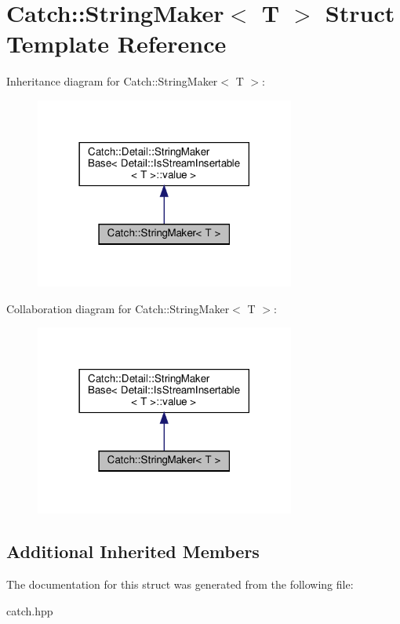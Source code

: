 \hypertarget{structCatch_1_1StringMaker}{}\section{Catch\+:\+:String\+Maker$<$ T $>$ Struct Template Reference}
\label{structCatch_1_1StringMaker}


Inheritance diagram for Catch\+:\+:String\+Maker$<$ T $>$\+:
\nopagebreak
\begin{figure}[H]
\begin{center}
\leavevmode
\includegraphics[width=242pt]{structCatch_1_1StringMaker__inherit__graph}
\end{center}
\end{figure}


Collaboration diagram for Catch\+:\+:String\+Maker$<$ T $>$\+:
\nopagebreak
\begin{figure}[H]
\begin{center}
\leavevmode
\includegraphics[width=242pt]{structCatch_1_1StringMaker__coll__graph}
\end{center}
\end{figure}
\subsection*{Additional Inherited Members}


The documentation for this struct was generated from the following file\+:\begin{DoxyCompactItemize}
\item 
catch.\+hpp\end{DoxyCompactItemize}
